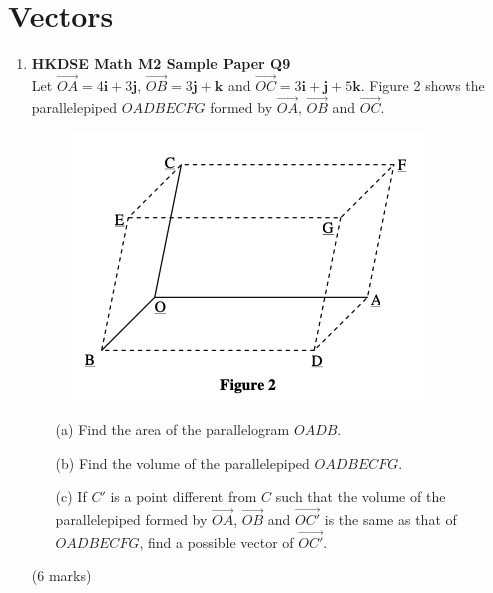 \documentclass{report}
\begin{document}
\chapter{Vectors}
\begin{enumerate}
	\item \textbf{HKDSE Math M2 Sample Paper Q9}\\
	Let $\overrightarrow{OA} = 4\textbf{i} +3 \textbf{j}$, $\overrightarrow{OB} = 3 \textbf{j} +\textbf {k}$ and $\overrightarrow{OC} = 3\textbf{i} + \textbf{j} +5\textbf {k}$. Figure 2 shows the parallelepiped $OADBECFG$ formed by $\overrightarrow{OA}$, $\overrightarrow{OB}$ and $\overrightarrow{OC}$. 
	\begin{figure}[H]
		\centering
		\includegraphics[width = .4\linewidth]{SPFigure2}
	\end{figure}
	\begin{enumerate}
		\item [(a)]Find the area of the parallelogram $OADB$.  
		\item [(b)]Find the volume of the parallelepiped $OADBECFG$.
		\item [(c)]If $C'$ is a point different from $C$ such that the volume of the parallelepiped formed by $\overrightarrow{OA}$, $\overrightarrow{OB}$ and $\overrightarrow{OC'}$ is the same as that of $OADBECFG$, find a possible vector of $\overrightarrow{OC'}$.
	\end{enumerate}
	(6 marks)

	\newpage
	

\end{enumerate}
\end{document}
